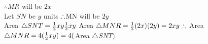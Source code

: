 \begin{eocsolutions}{}
{\begin{enumerate}[itemsep=5pt, label=\textbf{\arabic*}. ]
\begin{enumerate}[noitemsep, label=\textbf{(\alph*)} ]
$\therefore MR$ will be $2x$\\
Let $SN$ be $y$ units$\\
\therefore $MN will be $2y$\\
Area $\triangle SNT = \frac{1}{2}xy\\
\frac{1}{2} xy\\$
Area $\triangle MNR = \frac{1}{2} (2x)(2y)\\
=2xy\\
\therefore$ Area $ \triangle MNR = 4(\frac{1}{2}xy)\\
=4($Area $\triangle SNT)$
\end{enumerate}
\end{enumerate}}
\end{eocsolutions}


